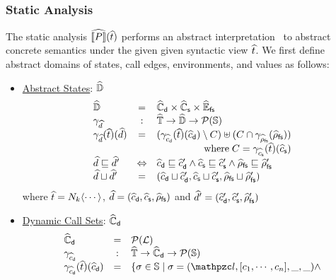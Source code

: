 \subsubsection{Static Analysis}

The static analysis $\widehat{\llbracket{P}\rrbracket}(\widehat{t})$ performs an abstract
interpretation~\cite{ai1977, ai1992} to abstract concrete semantics under the
given given syntactic view $\widehat{t}$.  We first define abstract domains of
states, call edges, environments, and values as follows:
\begin{itemize}
  \item \underline{Abstract States}: $\widehat{\mathbb{D}}$
    \[
      \begin{array}{lcl}
        \aelemset &=& \adcallset \times \ascallset \times \afsenvset\\

        \aelemgamma &:& \atreeset \rightarrow \aelemset \rightarrow
        \powerset{\stset}\\

        \aelemgamma(\atree)(\aelem) &=&
        (\adcallgamma(\atree)(\adcall) \setminus C) \uplus
        (C \cap \afsenvgamma(\afsenv))\\
        \multicolumn{3}{r}{\text{where} \; C = \ascallgamma(\atree)(\ascall)}\\

        \aelem \order \aelem' &\Leftrightarrow&
        \adcall \order \adcall' \wedge
        \ascall \order \ascall' \wedge
        \afsenv \order \afsenv'\\

        \aelem \join \aelem' &=&
        (\adcall \join \adcall', \ascall \join \ascall', \afsenv \join \afsenv')\\
      \end{array}
    \]
    where $\widehat{t} = N_k \langle \cdots \rangle$, $\widehat{d} = (\widehat{c}_{\textsf{d}}, \widehat{c}_{\textsf{s}},
    \widehat{\rho}_{\textsf{fs}})$ and $\widehat{d}' = (\widehat{c}_{\textsf{d}}', \widehat{c}_{\textsf{s}}', \widehat{\rho}_{\textsf{fs}}')$

  \item \underline{Dynamic Call Sets}: $\widehat{\mathbb{C}}_{\textsf{d}}$
    \[
      \begin{array}{lcl}
        \adcallset &=& \powerset{\labset}\\

        \adcallgamma &:& \atreeset \rightarrow \adcallset \rightarrow
        \powerset{\stset}\\

        \adcallgamma(\atree)(\adcall) &=& \{ \st \in \stset \mid
          \st = (\lab, [\ctxt_1, \cdots, \ctxt_n], \_, \_) \wedge\\&&


\end{array}\]
\end{itemize}

